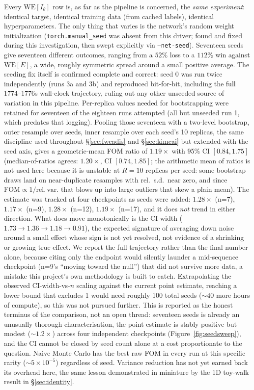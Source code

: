 \documentclass[a4paper,fleqn]{cas-sc}
\begin{document}
Every $\mathrm{WE}[I_\theta]$ row is, as far as the pipeline is concerned, the
\emph{same experiment}: identical target, identical training data (from cached labels),
identical hyperparameters. The only thing that varies is the network's random weight
initialization (\texttt{torch.manual\_seed} was absent from this driver; found and
fixed during this investigation, then swept explicitly via \texttt{--net-seed}).
Seventeen seeds give seventeen different outcomes, ranging from a $52\%$ loss to
	a $112\%$ win against $\mathrm{WE}[E]$, a wide, roughly symmetric spread around a
small positive average. The seeding fix itself is confirmed complete and correct: seed
0 was run twice independently (runs 3a and 3b) and reproduced bit-for-bit, including the
full 1774--1776s wall-clock trajectory, ruling out any other unseeded source of
variation in this pipeline. Per-replica values needed for bootstrapping were retained
for seventeen of the eighteen runs attempted (all but unseeded run 1, which predates that
logging).
Pooling those seventeen with a two-level bootstrap, outer resample over seeds,
inner resample over each seed's 10 replicas, the same discipline used throughout
\S\ref{sec:fwcadis} and \S\ref{sec:kimcai} but extended with the seed axis, gives a
geometric-mean FOM ratio of $1.19\times$ with 95\% CI $[0.84, 1.75]$ (median-of-ratios
agrees: $1.20\times$, CI $[0.74, 1.85]$; the arithmetic mean of ratios is not used here
because it is unstable at $R=10$ replicas per seed: some bootstrap draws land on
near-duplicate resamples with rel.\ s.d.\ near zero, and since $\mathrm{FOM}\propto
1/\mathrm{rel.\,var.}$ that blows up into large outliers that skew a plain mean).
The estimate was tracked at four checkpoints as seeds were added: $1.28\times$
(n=7), $1.17\times$ (n=9), $1.28\times$ (n=12), $1.19\times$ (n=17), and it does
\emph{not} trend in either direction. What does move monotonically is the CI width
($1.73\to1.36\to1.18\to0.91$), the expected signature of averaging down noise around a
small effect whose sign is not yet resolved, not evidence of a shrinking or growing true
effect. We report the full trajectory rather than the final number alone, because citing
only the endpoint would silently launder a mid-sequence checkpoint (n=9's ``moving
toward the null'') that did not survive more data, a mistake this project's own
methodology is built to catch.
Extrapolating the observed CI-width-vs-$n$ scaling against the current point
	estimate, reaching a lower bound that excludes 1 would need roughly 100 total seeds
	($\sim\!40$ more hours of compute), so this was not pursued further. This is reported as
the honest terminus of the comparison, not an open
thread: seventeen seeds is already an unusually thorough characterisation, the point
estimate is stably positive but modest ($\sim\!1.2\times$) across four independent
checkpoints (Figure~\ref{fig:seedsweep}), and the CI cannot be closed by seed count alone
at a cost proportionate to
the question. Naive Monte Carlo has the best raw FOM in every run
at this specific rarity ($\sim\!5\times10^{-5}$) regardless of seed. Variance
reduction has not yet earned back its overhead here, the same lesson demonstrated in
miniature by the 1D toy-walk result in \S\ref{sec:identity}.
\end{document}
